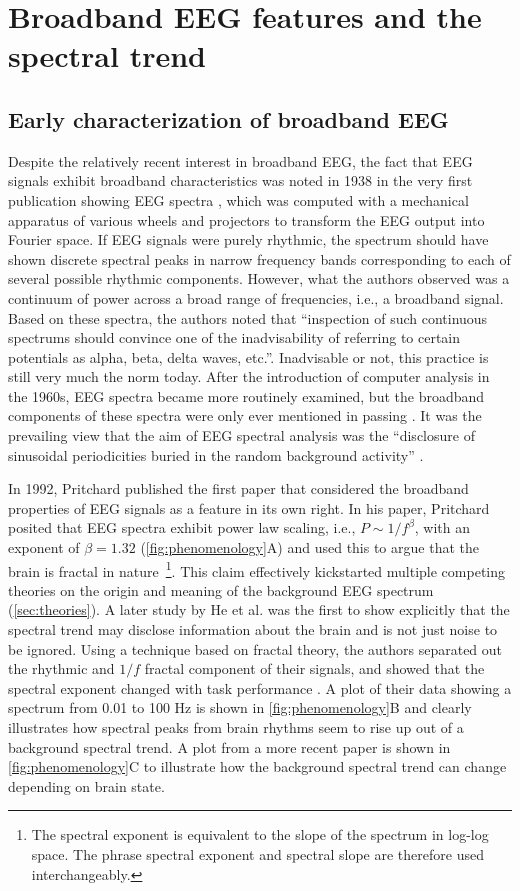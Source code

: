 \section{Broadband EEG features and the spectral trend} \label{sec:phenomenon}
\subsection{Early characterization of broadband EEG}
Despite the relatively recent interest in broadband EEG, the fact that EEG signals exhibit broadband characteristics was noted in 1938 in the very first publication showing EEG spectra \cite{Grass1938}, which was computed with a mechanical apparatus of various wheels and projectors to transform the EEG output into Fourier space. If EEG signals were purely rhythmic, the spectrum should have shown discrete spectral peaks in narrow frequency bands corresponding to each of several possible rhythmic components. However, what the authors observed was a continuum of power across a broad range of frequencies, i.e., a broadband signal. Based on these spectra, the authors noted that ``inspection of such continuous spectrums should convince one of the inadvisability of referring to certain potentials as alpha, beta, delta waves, etc.''\cite{Grass1938}. Inadvisable or not, this practice is still very much the norm today. After the introduction of computer analysis in the 1960s, EEG spectra became more routinely examined, but the broadband components of these spectra were only ever mentioned in passing \cite{Boudreau1963}. It was the prevailing view that the aim of EEG spectral analysis was the ``disclosure of sinusoidal periodicities buried in the random background activity'' \cite{Freeman1975}. 

In 1992, Pritchard \cite{Pritchard1992} published the first paper that considered the broadband properties of EEG signals as a feature in its own right. In his paper, Pritchard posited that EEG spectra exhibit power law scaling, i.e., $P\sim1/f^\beta$, with an exponent of $\beta=1.32$ (\autoref{fig:phenomenology}A) and used this to argue that the brain is fractal in nature~\footnote[2]{The spectral exponent is equivalent to the slope of the spectrum in log-log space. The phrase spectral exponent and spectral slope are therefore used interchangeably.}. This claim effectively kickstarted multiple competing theories on the origin and meaning of the background EEG spectrum (\autoref{sec:theories}). A later study by He et al. \cite{He2010} was the first to show explicitly that the spectral trend may disclose information about the brain and is not just noise to be ignored. Using a technique based on fractal theory, the authors separated out the rhythmic and $1/f$ fractal component of their signals, and showed that the spectral exponent changed with task performance \cite{He2010}. A plot of their data showing a spectrum from 0.01 to 100 \unit{\hertz} is shown in \autoref{fig:phenomenology}B and clearly illustrates how spectral peaks from brain rhythms seem to rise up out of a background spectral trend. A plot from a more recent paper \cite{Colombo2019} is shown in \autoref{fig:phenomenology}C to illustrate how the background spectral trend can change depending on brain state. 

